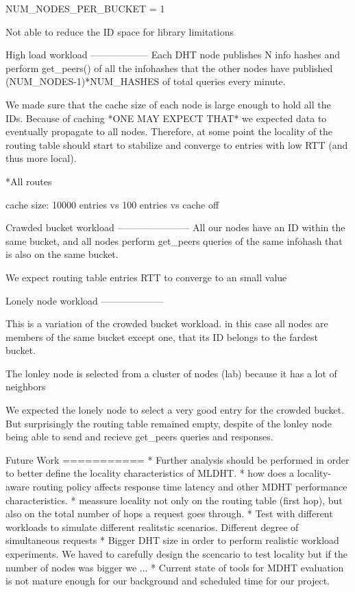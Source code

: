 NUM_NODES_PER_BUCKET = 1

Not able to reduce the ID space for library limitations

High load workload
------------------
Each DHT node publishes N info hashes and perform get_peers() of all the infohashes 
that the other nodes have published (NUM_NODES-1)*NUM_HASHES of total queries every minute.

We made sure that the cache size of each node is large enough to hold all the IDs. 
Because of caching *ONE MAY EXPECT THAT* we expected data to eventually propagate 
to all nodes. Therefore, at some point the locality of the routing table should start 
to stabilize and converge to entries with low RTT (and thus more local).

*All routes

cache size: 10000 entries vs 100 entries vs cache off


Crawded bucket workload
-----------------------
All our nodes have an ID within the same bucket, and all nodes perform get_peers 
queries of the same infohash that is also on the same bucket.

We expect routing table entries RTT to converge to an small value

Lonely node workload
--------------------

This is a variation of the crowded bucket workload. in this case all nodes are 
members of the same bucket except one, that its ID belongs to the fardest bucket.

The lonley node is selected from a cluster of nodes (lab) because it has a lot of neighbors 

We expected the lonely node to select a very good entry for the crowded bucket. 
But surprisingly the routing table remained empty, despite of the lonley node being 
able to send and recieve get_peers queries and responses.


Future Work
===========
* Further analysis should be performed in order to better define the locality characteristics of MLDHT.
* how does a locality-aware routing policy affects response time latency and other MDHT performance characteristics.
* meassure locality not only on the routing table (first hop), but also on the total number of hops a request goes through.
* Test with different workloads to simulate different realitstic scenarios. Different degree of simultaneous requests
* Bigger DHT size in order to perform realistic workload experiments. We haved to carefully design the scencario to test locality but if the number of nodes was bigger we ...
* Current state of tools for MDHT evaluation is not mature enough for our background and scheduled time for our project.

